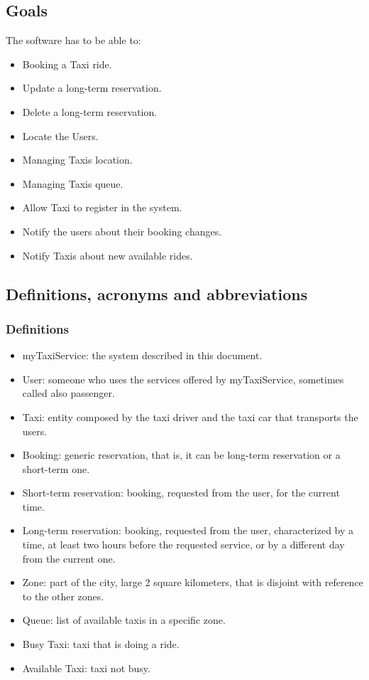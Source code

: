	\subsection{Goals}
	The software has to be able to:
	\begin{itemize}
		\item Booking a Taxi ride.
		\item Update a long-term reservation.
		\item Delete a long-term reservation.
		\item Locate the Users.
		\item Managing Taxis location.
		\item Managing Taxis queue.
		\item Allow Taxi to register in the system.
		\item Notify the users about their booking changes.
		\item Notify Taxis about new available rides.
	\end{itemize}
	
	\subsection{Definitions, acronyms and abbreviations}
		\subsubsection{Definitions}
		\begin{itemize}
			\item myTaxiService: the system described in this document.
			\item User: someone who uses the services offered by myTaxiService, sometimes called also passenger.
			\item Taxi: entity composed by the taxi driver and the taxi car that transports the users.
			\item Booking: generic reservation, that is, it can be long-term reservation or a short-term one.
			\item Short-term reservation: booking, requested from the user, for the current time.
			\item Long-term reservation: booking, requested from the user, characterized by a time, at least two hours before the requested service, or by a different day from the current one.
			\item Zone: part of the city, large 2 square kilometers, that is disjoint with reference to the other zones.
			\item Queue: list of available taxis in a specific zone.
			\item Busy Taxi: taxi that is doing a ride.
			\item Available Taxi: taxi not busy.
		\end{itemize}
